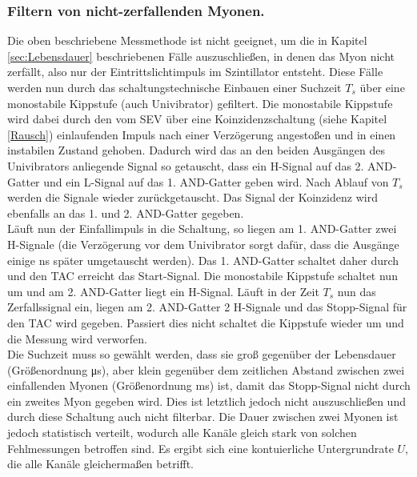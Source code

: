   \subsubsection{Filtern von nicht-zerfallenden Myonen.}
  Die oben beschriebene Messmethode ist nicht geeignet, um die in Kapitel \ref{sec:Lebensdauer}
  beschriebenen Fälle auszuschließen, in denen das Myon nicht zerfällt, also nur
  der Eintrittslichtimpuls im Szintillator entsteht. Diese Fälle werden nun
  durch das schaltungstechnische Einbauen einer Suchzeit $T_s$ über eine monostabile
  Kippstufe (auch Univibrator) gefiltert. Die monostabile Kippstufe wird dabei durch
  den vom SEV über eine Koinzidenzschaltung (siehe Kapitel \ref{Rausch}) einlaufenden
  Impuls nach einer Verzögerung angestoßen und in einen instabilen Zustand gehoben.
  Dadurch wird das an den beiden Ausgängen des Univibrators anliegende Signal so
  getauscht, dass ein H-Signal auf das 2. AND-Gatter und ein L-Signal auf das 1. AND-Gatter
  geben wird. Nach Ablauf von $T_s$ werden die Signale wieder zurückgetauscht.
  Das Signal der Koinzidenz wird ebenfalls an das 1. und 2. AND-Gatter gegeben.\\
  Läuft nun der Einfallimpuls in die Schaltung, so liegen am 1. AND-Gatter zwei
  H-Signale (die Verzögerung vor dem Univibrator sorgt dafür, dass die Ausgänge einige
  \si{\nano\second} später umgetauscht werden). Das 1. AND-Gatter schaltet daher durch
  und den TAC erreicht das Start-Signal. Die monostabile Kippstufe schaltet nun um
  und am 2. AND-Gatter liegt ein H-Signal. Läuft in der Zeit $T_s$ nun das Zerfallssignal
  ein, liegen am 2. AND-Gatter 2 H-Signale und das Stopp-Signal für den TAC wird gegeben.
  Passiert dies nicht schaltet die Kippstufe wieder um und die Messung wird verworfen.\\
  Die Suchzeit muss so gewählt werden, dass sie groß gegenüber der Lebensdauer (Größenordnung
  \si{\micro\second}), aber klein
  gegenüber dem zeitlichen Abstand zwischen zwei einfallenden Myonen
  (Größenordnung \si{\milli\second}) ist, damit das
  Stopp-Signal nicht durch ein zweites Myon gegeben wird. Dies ist letztlich jedoch nicht
  auszuschließen und durch diese Schaltung auch nicht filterbar. Die Dauer zwischen
  zwei Myonen ist jedoch statistisch verteilt, wodurch alle Kanäle gleich stark von
  solchen Fehlmessungen betroffen sind. Es ergibt sich eine kontuierliche Untergrundrate $U$,
  die alle Kanäle gleichermaßen betrifft.

